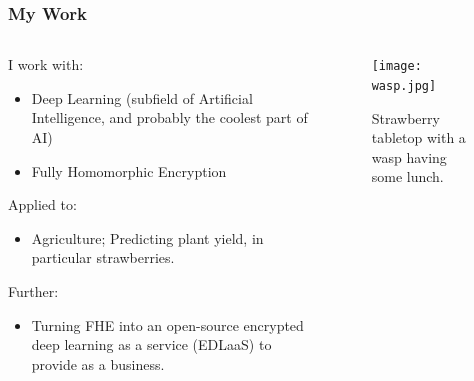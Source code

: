 \documentclass[aspectratio=169]{beamer}
\begin{document}
  \begin{frame}
    \frametitle{My Work}
    \begin{columns}
      \begin{column}{0.5\textwidth}
        I work with:
        \begin{itemize}
          \item Deep Learning (subfield of Artificial Intelligence, and probably the coolest part of AI)
          \item Fully Homomorphic Encryption
        \end{itemize}
        Applied to:
        \begin{itemize}
          \item Agriculture; Predicting plant yield, in particular strawberries.
        \end{itemize}
        Further:
        \begin{itemize}
          \item Turning FHE into an open-source encrypted deep learning as a service (EDLaaS) to provide as a business.
        \end{itemize}
      \end{column}
      \begin{column}{0.5\textwidth}
        \begin{figure}[th!]
          \centering
          \texttt{[image: wasp.jpg]}
          \caption{Strawberry tabletop with a wasp having some lunch. \autocite{repository}}
          \label{fig:wasp}
        \end{figure}
      \end{column}

    \end{columns}
  \end{frame}
\end{document}

